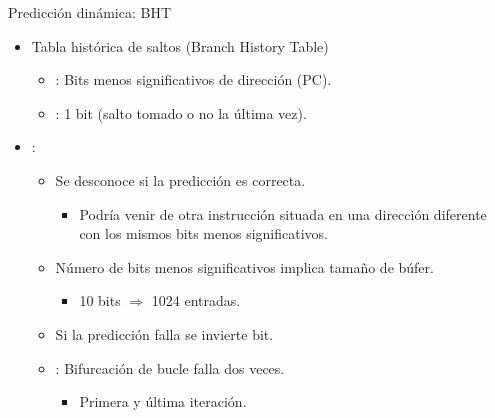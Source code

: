 \begin{frame}[t]{Predicción dinámica: BHT}
\begin{itemize}
  \item Tabla histórica de saltos (Branch History Table)
    \begin{itemize}
      \item {}: Bits menos significativos de dirección (PC).
      \item {}: 1 bit (salto tomado o no la última vez).
    \end{itemize}
  \item {}:
    \begin{itemize}
      \item Se desconoce si la predicción es correcta.
        \begin{itemize}
          \item Podría venir de otra instrucción situada en una dirección
                diferente con los mismos bits menos significativos.
        \end{itemize}
        \item Número de bits menos significativos implica tamaño de búfer.
          \begin{itemize}
            \item 10 bits $\Rightarrow$ 1024 entradas.
          \end{itemize}
        \item Si la predicción falla se invierte bit.
        \item {}: Bifurcación de bucle falla dos veces.
          \begin{itemize}
            \item Primera y última iteración.
          \end{itemize}
    \end{itemize}
\end{itemize}
\end{frame}

